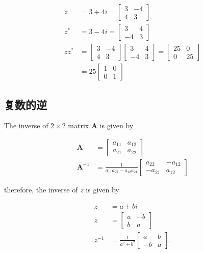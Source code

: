 $$
\begin{aligned}
z & =3+4 i=\left[\begin{array}{cc}
3 & -4 \\
4 & 3
\end{array}\right] \\
z^{*} & =3-4 i=\left[\begin{array}{cc}
3 & 4 \\
-4 & 3
\end{array}\right] \\
z z^{*} & =\left[\begin{array}{cc}
3 & -4 \\
4 & 3
\end{array}\right]\left[\begin{array}{cc}
3 & 4 \\
-4 & 3
\end{array}\right]=\left[\begin{array}{cc}
25 & 0 \\
0 & 25
\end{array}\right] \\
& =25\left[\begin{array}{cc}
1 & 0 \\
0 & 1
\end{array}\right]
\end{aligned}
$$

\subsection{复数的逆}
The inverse of $2 \times 2$ matrix $\mathbf{A}$ is given by

$$
\begin{aligned}
\mathbf{A} & =\left[\begin{array}{ll}
a_{11} & a_{12} \\
a_{21} & a_{22}
\end{array}\right] \\
\mathbf{A}^{-1} & =\frac{1}{a_{11} a_{22}-a_{12} a_{21}}\left[\begin{array}{cc}
a_{22} & -a_{12} \\
-a_{21} & a_{12}
\end{array}\right]
\end{aligned}
$$

therefore, the inverse of $z$ is given by

$$
\begin{aligned}
z & =a+b i \\
z & =\left[\begin{array}{cc}
a & -b \\
b & a
\end{array}\right] \\
z^{-1} & =\frac{1}{a^{2}+b^{2}}\left[\begin{array}{cc}
a & b \\
-b & a
\end{array}\right] .
\end{aligned}
$$

